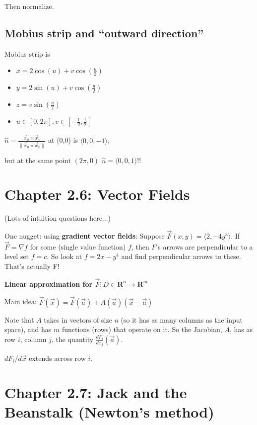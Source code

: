 \documentclass[11pt, oneside]{article}   	%
\begin{document}
Then normalize.

\subsection{Mobius strip and ``outward direction''}
Mobius strip is 
\begin{itemize}
\item $x = 2\cos(u) + v\cos(\frac{u}{2})$
\item $y = 2\sin(u) + v\cos(\frac{u}{2})$
\item $z = v \sin(\frac{u}{2})$
\item $u \in [0, 2\pi], v \in [-\frac{1}{2}, \frac{1}{2}]$
\end{itemize}

$\hat{n} = \frac
	{\vec{x}_u \times  \vec{x}_v}
	{\|\vec{x}_u \times  \vec{x}_v\|}
	$ at (0,0) is $\langle 0, 0, -1 \rangle$, 
	
but at the same point $(2\pi, 0)$ $\hat{n} = \langle 0, 0, 1 \rangle$!!
	


\section{Chapter 2.6: Vector Fields}

(Lots of intuition questions here...)

One nugget: using \textbf{gradient vector fields}:
Suppose $\vec{F}(x,y) = \langle 2, -4y^3 \rangle$.  
If $\vec{F} = \nabla f$ for some (single value function) $f$, then $F$'s arrows are perpendicular to a level set $f = c$.
So look at $f  =  2x -y^4 $ and find perpendicular arrows to these.  That's actually F!

\textbf{Linear approximation for $\vec{F}: D \in \mathbf{R}^n \rightarrow \mathbf{R}^m$}

Main idea: 
$\vec{F}(\vec{x}) = \vec{F}(\vec{a}) + A(\vec{a})(\vec{x} - \vec{a})$

Note that $A$ takes in vectors of size $n$ (so it has as many columns as the input space), and has $m$ functions (rows) that operate on it.
So the Jacobian, $A$, has as row $i$, column $j$, the quantity $\frac{dF_i}{dx_j}(\vec{a})$.

$dF_i/d\vec{x}$ extends across row $i$.

\section{Chapter 2.7: Jack and the Beanstalk (Newton's method)}
\end{document}
